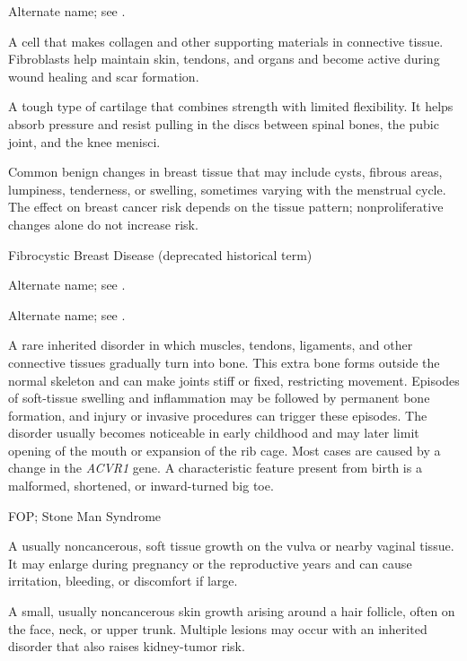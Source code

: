  Alternate name; see .

 A cell that makes collagen and other supporting materials in connective tissue. Fibroblasts help maintain skin, tendons, and organs and become active during wound healing and scar formation.

 A tough type of cartilage that combines strength with limited flexibility. It helps absorb pressure and resist pulling in the discs between spinal bones, the pubic joint, and the knee menisci.

 Common benign changes in breast tissue that may include cysts, fibrous areas, lumpiness, tenderness, or swelling, sometimes varying with the menstrual cycle. The effect on breast cancer risk depends on the tissue pattern; nonproliferative changes alone do not increase risk.

\synonyms
Fibrocystic Breast Disease (deprecated historical term)

 Alternate name; see .

 Alternate name; see .

 A rare inherited disorder in which muscles, tendons, ligaments, and other connective tissues gradually turn into bone. This extra bone forms outside the normal skeleton and can make joints stiff or fixed, restricting movement. Episodes of soft-tissue swelling and inflammation may be followed by permanent bone formation, and injury or invasive procedures can trigger these episodes. The disorder usually becomes noticeable in early childhood and may later limit opening of the mouth or expansion of the rib cage. Most cases are caused by a change in the \textit{ACVR1} gene. A characteristic feature present from birth is a malformed, shortened, or inward-turned big toe.

\synonyms
FOP; Stone Man Syndrome

 A usually noncancerous, soft tissue growth on the vulva or nearby vaginal tissue. It may enlarge during pregnancy or the reproductive years and can cause irritation, bleeding, or discomfort if large.

 A small, usually noncancerous skin growth arising around a hair follicle, often on the face, neck, or upper trunk. Multiple lesions may occur with an inherited disorder that also raises kidney-tumor risk.

